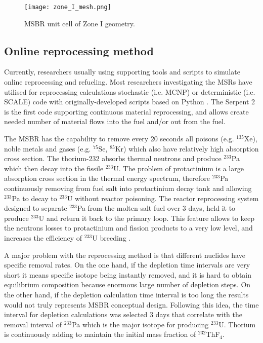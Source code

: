 \documentclass{anstrans}
\begin{document}
\begin{figure}[h] %
        \centering
        \texttt{[image: zone\_I\_mesh.png]}
        \caption{MSBR unit cell of Zone I geometry.}
        \label{fig:zoneI}
\end{figure}

\subsection{Online reprocessing method}

Currently, researchers usually using supporting tools and scripts to simulate 
online reprocessing and refueling. Most researchers investigating the 
\glspl{MSR} have utilised for reprocessing calculations stochastic (i.e. 
\gls{MCNP}) or deterministic (i.e. SCALE) code with originally-developed 
scripts based on Python \cite{jeong_equilibrium_2016,park_whole_2015}. The 
Serpent 2 is the first code supporting continuous material reprocessing, and 
allows create needed number of material flows into the fuel and/or out from the 
fuel.

The \gls{MSBR} has the capability to remove every 20 seconds all poisons (e.g. 
$^{135}$Xe), noble metals and gases (e.g. $^{75}$Se, $^{85}$Kr) which also have 
relatively high absorption cross section. The thorium-232 absorbs thermal 
neutrons and produce $^{233}$Pa which then decay into the fissile $^{233}$U. 
The problem of protactinium is a large absorption cross section in the thermal 
energy spectrum, therefore $^{233}$Pa continuously removing from fuel salt into 
protactinium decay tank and allowing $^{233}$Pa to decay to $^{233}$U without 
reactor poisoning. The reactor reprocessing system designed to separate 
$^{233}$Pa from the molten-salt fuel over 3 days, held it to produce $^{233}$U 
and return it back to the primary loop. This feature allows to keep the 
neutrons losses to protactinium and fission products to a very low level, and 
increases the efficiency of $^{233}$U breeding \cite{robertson_conceptual_1971}.

A major problem with the reprocessing method is that different nuclides have 
specific removal rates. On the one hand, if the depletion time intervals are 
very short it means specific isotope being instantly removed, and it is hard to 
obtain equilibrium composition because enormous large number of depletion 
steps. On the other hand, if the depletion calculation time interval is too 
long the results would not truly represents \gls{MSBR} conceptual design. 
Following this idea, the time interval for depletion calculations was selected 
3 days that correlate with the removal interval of $^{233}$Pa which is the 
major isotope for producing $^{233}$U. Thorium is continuously adding to 
maintain the initial mass fraction of $^{232}$ThF$_4$.
\end{document}
